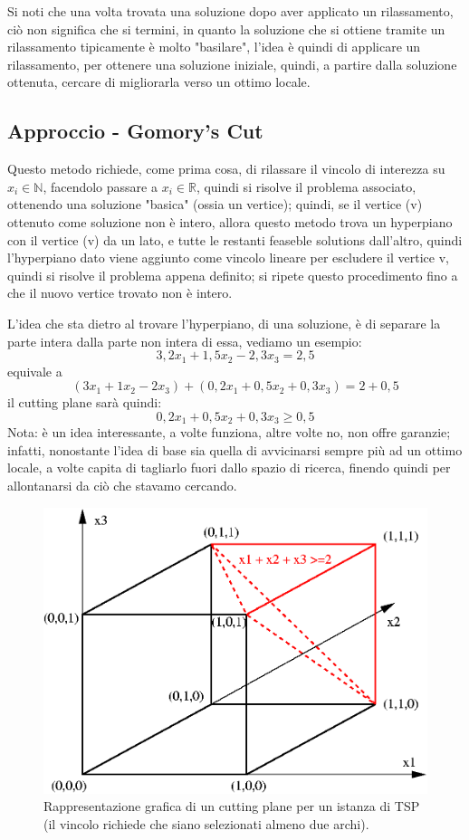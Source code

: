 \documentclass[12pt,a4paper]{article}
\begin{document}
Si noti che una volta trovata una soluzione dopo aver applicato un rilassamento, ciò non significa che si termini, in quanto la soluzione che si ottiene tramite un rilassamento tipicamente è molto "basilare", l'idea è quindi di applicare un rilassamento, per ottenere una soluzione iniziale, quindi, a partire dalla soluzione ottenuta, cercare di migliorarla verso un ottimo locale.

\subsection{Approccio - Gomory's Cut}
Questo metodo richiede, come prima cosa, di rilassare il vincolo di interezza su $x_{i} \in \mathbb{N}$, facendolo passare a $x_{i} \in \mathbb{R}$, quindi si risolve il problema associato, ottenendo una soluzione "basica" (ossia un vertice); quindi, se il vertice (v) ottenuto come soluzione non è intero, allora questo metodo trova un hyperpiano con il vertice  (v) da un lato, e tutte le restanti feaseble solutions dall'altro, quindi l'hyperpiano dato viene aggiunto come vincolo lineare per escludere il vertice v, quindi si risolve il problema appena definito; si ripete questo procedimento fino a che il nuovo vertice trovato non è intero.

L'idea che sta dietro al trovare l'hyperpiano, di una soluzione, è di separare la parte intera dalla parte non intera di essa, vediamo un esempio:
$$ 3,2x_{1} +  1,5x_{2} - 2,3x_{3} = 2,5 $$
equivale a
$$ (3x_{1} +  1x_{2} - 2x_{3}) + (0,2x_{1} +  0,5x_{2} + 0,3x_{3}) = 2 + 0,5$$
il cutting plane sarà quindi:
$$ 0,2x_{1} +  0,5x_{2} + 0,3x_{3} \geq 0,5 $$
Nota: è un idea interessante, a volte funziona, altre volte no, non offre garanzie; infatti, nonostante l'idea di base sia quella di avvicinarsi sempre più ad un ottimo locale, a volte capita di tagliarlo fuori dallo spazio di ricerca, finendo quindi per allontanarsi da ciò che stavamo cercando.

\begin{figure}[h]
	\centering
	\includegraphics[width=0.8\linewidth]{img/TSP_cutting_plane.png}
	\caption{Rappresentazione grafica di un cutting plane per un istanza di TSP (il vincolo richiede che siano selezionati almeno due archi).}
	\label{fig:TSP_cutting_plane}
\end{figure}
\end{document}
